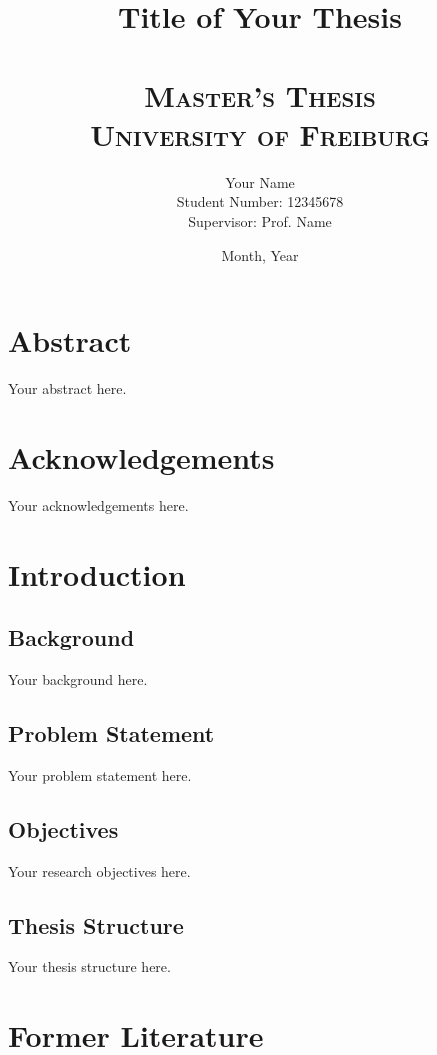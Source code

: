 \documentclass[12pt,a4paper]{report}
\title{
    \HRule \\[0.4cm]
    {\huge \bfseries Title of Your Thesis \\[0.4cm]}
    \HRule \\[1.5cm]
    \textsc{\Large Master's Thesis}\\[0.5cm]
    \textsc{\large University of Freiburg}\\[0.5cm]
}
\author{
    \Large Your Name\\
    \Large Student Number: 12345678\\
    \Large Supervisor: Prof. Name
}
\date{Month, Year}
\begin{document}
\maketitle
\thispagestyle{empty}
\newpage

\chapter*{Abstract}
Your abstract here.

\newpage

\chapter*{Acknowledgements}
Your acknowledgements here.

\newpage

\tableofcontents

\newpage
\listoffigures

\newpage
\listoftables

\newpage
{}

\chapter{Introduction}
\section{Background}
Your background here.

\section{Problem Statement}
Your problem statement here.

\section{Objectives}
Your research objectives here.

\section{Thesis Structure}
Your thesis structure here.

\chapter{Former Literature}
\end{document}
